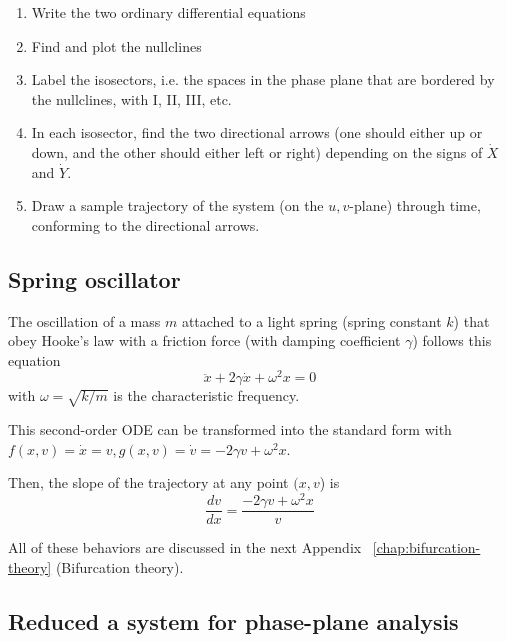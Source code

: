 \begin{enumerate}
\item Write the two ordinary differential equations 

\item Find and plot the nullclines

\item Label the isosectors, i.e. the spaces in the phase plane that
  are bordered by the nullclines, with I, II, III, etc.

\item In each isosector, find the two directional arrows (one should
  either up or down, and the other should either left or right)
  depending on the signs of $\dot{X}$ and $\dot{Y}$.

\item Draw a sample trajectory of the system (on the $u,v$-plane)
  through time, conforming to the directional arrows.
\end{enumerate}

\subsection{Spring oscillator}
\label{sec:spring-oscillator}

The oscillation of a mass $m$ attached to a light spring (spring
constant $k$) that obey Hooke's law with a friction force (with
damping coefficient $\gamma$) follows this equation
\begin{equation}
  \label{eq:102}
  \ddot{x} + 2\gamma \dot{x} + \omega^2 x = 0
\end{equation}
with $\omega=\sqrt{k/m}$ is the characteristic frequency. 

This second-order ODE can be transformed into the standard form with
$f(x,v) = \dot{x} = v, g(x,v) = \dot{v} = -2\gamma v + \omega^2 x$.

Then, the slope of the trajectory at any point $(x,v$) is
\begin{equation}
  \label{eq:104}
  \frac{dv}{dx} = \frac{-2\gamma v + \omega^2 x}{v}
\end{equation}

All of these behaviors are discussed in the next
Appendix ~\ref{chap:bifurcation-theory} (Bifurcation theory).

\subsection{Reduced a system for phase-plane analysis}
\label{sec:reduced-system-phase}

